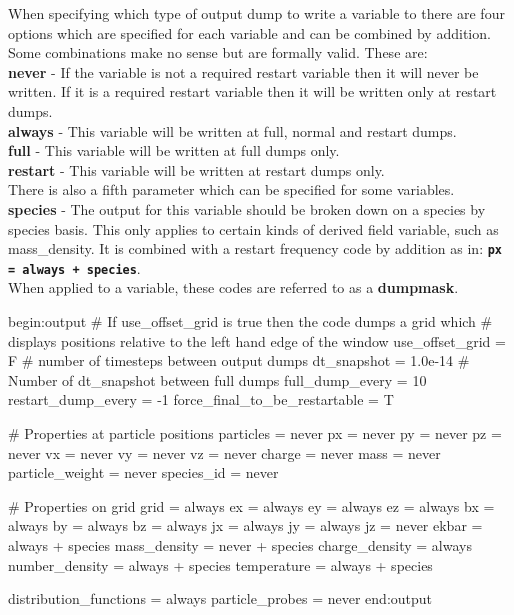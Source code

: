 \documentclass[12pt,a4paper]{article}
\newcommand{\emphtext}{\color{warwickdark} \fontfamily{phv}\selectfont\large\bf}
\newcommand{\inlinecode}[1]{{\color{warwickred} \bf\texttt{#1}}}
\newcommand{\inlineemph}[1]{{\color{warwicklight} \bf{#1}}}
\newenvironment{lboxverbatim}[1]{
\setlength{\FrameSep}{0pt}
\def\FrameCommand{\fboxsep=0pt \colorbox{shadecolor}}
\MakeFramed{\FrameRestore}
\vspace{-13.5pt}
\fvset{label=#1}
\boxverb
}{
\endboxverb
\vspace{-13.5pt}
\endMakeFramed
}
\begin{document}
When specifying which type of output dump to write a variable to there are four
options which are specified for each variable and can be combined by
addition. Some combinations make no sense but are formally
valid. These are:\\

{\emphtext never} - If the variable is not a required restart variable then it
will never be written. If it is a required restart variable then it will be
written only at restart dumps.\\

{\emphtext always} - This variable will be written at full, normal and restart
dumps.\\

{\emphtext full} - This variable will be written at full dumps only.\\

{\emphtext restart} - This variable will be written at restart dumps only.\\

There is also a fifth parameter which can be specified for some variables.\\

{\emphtext species} - The output for this variable should be broken down on a
species by species basis. This only applies to certain kinds of derived field
variable, such as mass\_density. It is combined with a restart frequency code
by addition as in: \inlinecode{px = always + species}.\\

When applied to a variable, these codes are referred to as a
\inlineemph{dumpmask}.\\

\begin{lboxverbatim}{output block}
begin:output
   # If use_offset_grid is true then the code dumps a grid which
   # displays positions relative to the left hand edge of the window
   use_offset_grid = F
   # number of timesteps between output dumps
   dt_snapshot = 1.0e-14
   # Number of dt_snapshot between full dumps
   full_dump_every = 10
   restart_dump_every = -1
   force_final_to_be_restartable = T

   # Properties at particle positions
   particles = never
   px = never
   py = never
   pz = never
   vx = never
   vy = never
   vz = never
   charge = never
   mass = never
   particle_weight = never
   species_id = never

   # Properties on grid
   grid = always
   ex = always
   ey = always
   ez = always
   bx = always
   by = always
   bz = always
   jx = always
   jy = always
   jz = never
   ekbar = always + species
   mass_density = never + species
   charge_density = always
   number_density = always + species
   temperature = always + species

   distribution_functions = always
   particle_probes = never
end:output
\end{lboxverbatim}
\end{document}

